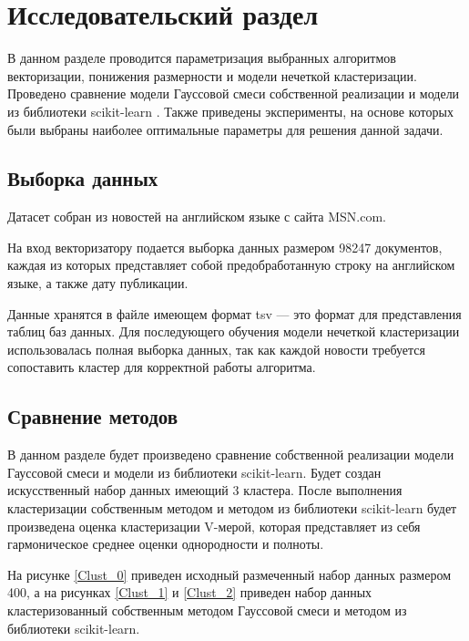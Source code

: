 \section{Исследовательский раздел}

В данном разделе проводится параметризация выбранных алгоритмов векторизации, понижения размерности и модели нечеткой кластеризации. Проведено сравнение модели Гауссовой смеси собственной реализации и модели из библиотеки scikit-learn \cite{GMM}. Также приведены эксперименты, на основе которых были выбраны наиболее оптимальные параметры для решения данной задачи.

\subsection{Выборка данных}

Датасет собран из новостей на английском языке с сайта MSN.com. \cite{msn}

На вход векторизатору подается выборка данных размером 98247 документов, каждая из которых представляет собой предобработанную строку на английском языке, а также дату публикации.

Данные хранятся в файле имеющем формат tsv --- это формат для представления таблиц баз данных. Для последующего обучения модели нечеткой кластеризации использовалась полная выборка данных, так как каждой новости требуется сопоставить кластер для корректной работы алгоритма.

\subsection{Сравнение методов}

В данном разделе будет произведено сравнение собственной реализации модели Гауссовой смеси и модели из библиотеки scikit-learn. Будет создан искусственный набор данных имеющий 3 кластера. После выполнения кластеризации собственным методом и методом из библиотеки scikit-learn будет произведена оценка кластеризации V-мерой, которая представляет из себя гармоническое среднее оценки однородности и полноты.

На рисунке \ref{Clust_0} приведен исходный размеченный набор данных размером 400, а на рисунках \ref{Clust_1} и \ref{Clust_2} приведен набор данных кластеризованный собственным методом Гауссовой смеси и методом из библиотеки scikit-learn.

